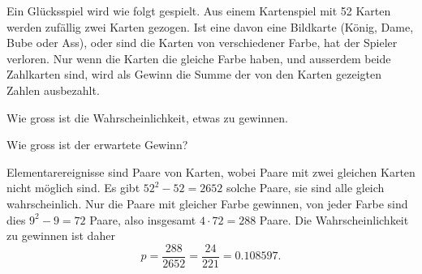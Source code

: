 Ein Glücksspiel wird wie folgt gespielt. Aus einem Kartenspiel
mit 52 Karten werden zufällig zwei Karten gezogen. Ist eine
davon eine Bildkarte (König, Dame, Bube oder Ass), oder sind die
Karten von verschiedener Farbe, hat der Spieler verloren. Nur wenn
die Karten die gleiche Farbe haben, und ausserdem beide Zahlkarten
sind, wird als Gewinn die Summe der von den Karten gezeigten Zahlen
ausbezahlt.
\begin{teilaufgaben}
\item Wie gross ist die Wahrscheinlichkeit, etwas zu gewinnen.
\item Wie gross ist der erwartete Gewinn?
\end{teilaufgaben}

\begin{loesung}
\begin{teilaufgaben}
\item
Elementarereignisse sind Paare von Karten, wobei Paare mit zwei
gleichen Karten nicht möglich sind. Es gibt $52^2-52=2652$ solche
Paare, sie sind alle gleich wahrscheinlich. Nur die Paare mit gleicher
Farbe gewinnen, von jeder Farbe sind dies $9^2-9=72$ Paare, also
insgesamt $4\cdot 72=288$ Paare. Die Wahrscheinlichkeit zu gewinnen
ist daher
\[
p=\frac{288}{2652}=\frac{24}{221}=0.108597.
\]


\end{teilaufgaben}
\end{loesung}
